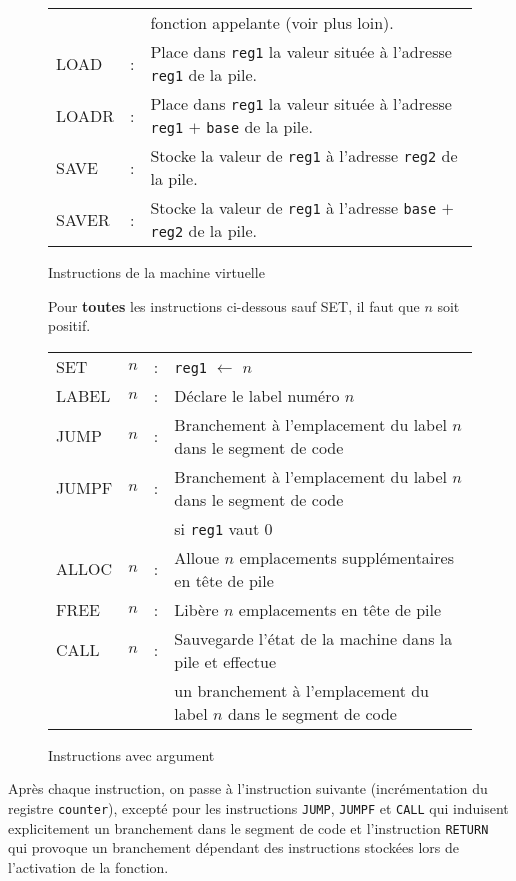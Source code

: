 \documentclass[12pt,a4]{article}
\begin{document}
\begin{figure}
\begin{tabular}{lll}
            && fonction appelante (voir plus loin).\\
    LOAD    &:& Place dans {\tt reg1} la valeur située à l'adresse {\tt reg1}
    de la pile.\\
    LOADR   &:& Place dans {\tt reg1} la valeur située à l'adresse
    {\tt reg1} $+$ {\tt base} de la pile.\\
    SAVE    &:& Stocke la valeur de {\tt reg1} à l'adresse {\tt reg2} de la pile.\\
    SAVER   &:& Stocke la valeur de {\tt reg1} à l'adresse {\tt base} $+$ {\tt reg2} de la pile.\\
  \end{tabular}
  
  \caption{Instructions de la machine virtuelle}
  \label{fig:instruct}
\end{figure}

\begin{figure}
  \centering
  Pour \textbf{toutes} les instructions ci-dessous sauf SET, il faut que $n$ soit positif.
  \begin{tabular}{llll}
    SET   &$n$&:& {\tt reg1} $\gets$ $n$\\
    LABEL &$n$&:& Déclare le label numéro $n$\\
    JUMP  &$n$&:& Branchement à l'emplacement du label $n$ dans le segment de code\\
    JUMPF &$n$&:& Branchement à l'emplacement du label $n$ dans le segment de code\\
    &&& si {\tt reg1} vaut $0$\\
    ALLOC &$n$&:& Alloue $n$ emplacements supplémentaires en tête de
    pile\\
    FREE  &$n$&:& Libère $n$ emplacements en tête de pile\\
    CALL  &$n$&:& Sauvegarde l'état de la machine dans la pile et effectue \\
    &&& un branchement à l'emplacement du label $n$ dans le segment de code\\
  \end{tabular}
  \caption{Instructions avec argument}
\label{fig:instructarg}
\end{figure}

Après chaque instruction, on passe à l'instruction suivante
(incrémentation du registre {\tt counter}), excepté
pour les instructions {\tt JUMP}, {\tt JUMPF} et {\tt CALL} qui
induisent explicitement un branchement dans le segment de code
et l'instruction {\tt RETURN} qui provoque un branchement dépendant
des instructions stockées lors de l'activation de la fonction.
\end{document}
